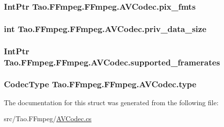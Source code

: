 \label{struct_tao_1_1_f_fmpeg_1_1_f_fmpeg_1_1_a_v_codec_a3bcd75e446ee7e0ee4434593165a694b}
\hypertarget{struct_tao_1_1_f_fmpeg_1_1_f_fmpeg_1_1_a_v_codec_ace69e7241cca98f5073e1d5aaac10bc4}{
\subsubsection[{pix\_\-fmts}]{\setlength{\rightskip}{0pt plus 5cm}IntPtr {\bf Tao.FFmpeg.FFmpeg.AVCodec.pix\_\-fmts}}}
\label{struct_tao_1_1_f_fmpeg_1_1_f_fmpeg_1_1_a_v_codec_ace69e7241cca98f5073e1d5aaac10bc4}
\hypertarget{struct_tao_1_1_f_fmpeg_1_1_f_fmpeg_1_1_a_v_codec_acd425f2226cd121343ef4e00192726e9}{
\subsubsection[{priv\_\-data\_\-size}]{\setlength{\rightskip}{0pt plus 5cm}int {\bf Tao.FFmpeg.FFmpeg.AVCodec.priv\_\-data\_\-size}}}
\label{struct_tao_1_1_f_fmpeg_1_1_f_fmpeg_1_1_a_v_codec_acd425f2226cd121343ef4e00192726e9}
\hypertarget{struct_tao_1_1_f_fmpeg_1_1_f_fmpeg_1_1_a_v_codec_acc8e94ca5dfc811afe55158be3fafbd7}{
\subsubsection[{supported\_\-framerates}]{\setlength{\rightskip}{0pt plus 5cm}IntPtr {\bf Tao.FFmpeg.FFmpeg.AVCodec.supported\_\-framerates}}}
\label{struct_tao_1_1_f_fmpeg_1_1_f_fmpeg_1_1_a_v_codec_acc8e94ca5dfc811afe55158be3fafbd7}
\hypertarget{struct_tao_1_1_f_fmpeg_1_1_f_fmpeg_1_1_a_v_codec_af704fbe01412cd798eba2c7abb44d347}{
\subsubsection[{type}]{\setlength{\rightskip}{0pt plus 5cm}CodecType {\bf Tao.FFmpeg.FFmpeg.AVCodec.type}}}
\label{struct_tao_1_1_f_fmpeg_1_1_f_fmpeg_1_1_a_v_codec_af704fbe01412cd798eba2c7abb44d347}


The documentation for this struct was generated from the following file:\begin{DoxyCompactItemize}
\item 
src/Tao.FFmpeg/\hyperlink{_a_v_codec_8cs}{AVCodec.cs}\end{DoxyCompactItemize}
